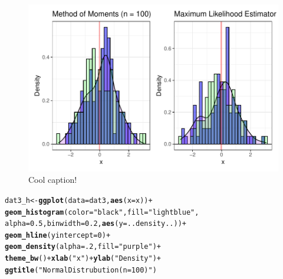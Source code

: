 \documentclass{article}\usepackage[]{graphicx}\usepackage[]{color}
\makeatletter
\def\maxwidth{ %
  \ifdim\Gin@nat@width>\linewidth
    \linewidth
  \else
    \Gin@nat@width
  \fi
}
\newcommand{\hlnum}[1]{\textcolor[rgb]{0.686,0.059,0.569}{#1}}%
\newcommand{\hlstr}[1]{\textcolor[rgb]{0.192,0.494,0.8}{#1}}%
\newcommand{\hlopt}[1]{\textcolor[rgb]{0,0,0}{#1}}%
\newcommand{\hlstd}[1]{\textcolor[rgb]{0.345,0.345,0.345}{#1}}%
\newcommand{\hlkwb}[1]{\textcolor[rgb]{0.69,0.353,0.396}{#1}}%
\newcommand{\hlkwc}[1]{\textcolor[rgb]{0.333,0.667,0.333}{#1}}%
\newcommand{\hlkwd}[1]{\textcolor[rgb]{0.737,0.353,0.396}{\textbf{#1}}}%
\newenvironment{kframe}{%
 \def\at@end@of@kframe{}%
 \ifinner\ifhmode%
  \def\at@end@of@kframe{\end{minipage}}%
  \begin{minipage}{\columnwidth}%
 \fi\fi%
 \def\FrameCommand##1{\hskip\@totalleftmargin \hskip-\fboxsep
 \colorbox{shadecolor}{##1}\hskip-\fboxsep
     \hskip-\linewidth \hskip-\@totalleftmargin \hskip\columnwidth}%
 \MakeFramed {\advance\hsize-\width
   \@totalleftmargin\z@ \linewidth\hsize
   \@setminipage}}%
 {\par\unskip\endMakeFramed%
 \at@end@of@kframe}
\newenvironment{knitrout}{}{} %
\makeatother
\begin{document}
\begin{enumerate}
\begin{enumerate}
  \begin{figure}[H]
\begin{center}
\begin{knitrout}
\color{fgcolor}
\includegraphics[width=\maxwidth]{figure/unnamed-chunk-37-1} 
\end{knitrout}
	\caption{Cool caption!}
\label{p2plot5} %
\end{center}
\end{figure}
  
\begin{knitrout}
\color{fgcolor}\begin{kframe}
\begin{alltt}
\hlstd{dat3_h} \hlkwb{<-} \hlkwd{ggplot}\hlstd{(}\hlkwc{data}\hlstd{=dat3,} \hlkwd{aes}\hlstd{(}\hlkwc{x}\hlstd{=x))}\hlopt{+}
  \hlkwd{geom_histogram}\hlstd{(}\hlkwc{color}\hlstd{=}\hlstr{"black"}\hlstd{,} \hlkwc{fill} \hlstd{=} \hlstr{"lightblue"}\hlstd{,}
                 \hlkwc{alpha} \hlstd{=} \hlnum{0.5}\hlstd{,} \hlkwc{binwidth} \hlstd{=} \hlnum{0.2}\hlstd{,} \hlkwd{aes}\hlstd{(}\hlkwc{y}\hlstd{=..density..))}\hlopt{+}
  \hlkwd{geom_hline}\hlstd{(}\hlkwc{yintercept}\hlstd{=}\hlnum{0}\hlstd{)}\hlopt{+}
  \hlkwd{geom_density}\hlstd{(}\hlkwc{alpha}\hlstd{=}\hlnum{.2}\hlstd{,} \hlkwc{fill}\hlstd{=}\hlstr{"purple"}\hlstd{)} \hlopt{+}
  \hlkwd{theme_bw}\hlstd{()}\hlopt{+} \hlkwd{xlab}\hlstd{(}\hlstr{"x"}\hlstd{)}\hlopt{+} \hlkwd{ylab}\hlstd{(}\hlstr{"Density"}\hlstd{)}\hlopt{+}
  \hlkwd{ggtitle}\hlstd{(}\hlstr{"Normal Distrubution (n = 100)"}\hlstd{)}


\end{alltt}
\end{kframe}
\end{knitrout}
\end{enumerate}
\end{enumerate}
\end{document}
